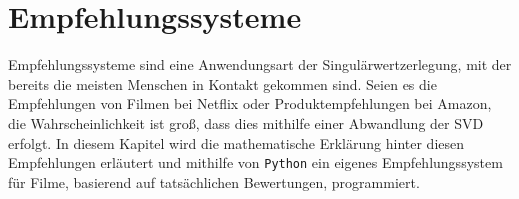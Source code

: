 \chapter{Empfehlungssysteme}

Empfehlungssysteme sind eine Anwendungsart der Singulärwertzerlegung, mit der bereits die meisten Menschen in Kontakt gekommen sind.
Seien es die Empfehlungen von Filmen bei Netflix oder Produktempfehlungen bei Amazon, die Wahrscheinlichkeit ist groß, dass dies mithilfe einer Abwandlung der SVD erfolgt.
In diesem Kapitel wird die mathematische Erklärung hinter diesen Empfehlungen erläutert und mithilfe von \texttt{Python} ein eigenes Empfehlungssystem für Filme, basierend auf tatsächlichen Bewertungen, programmiert.
